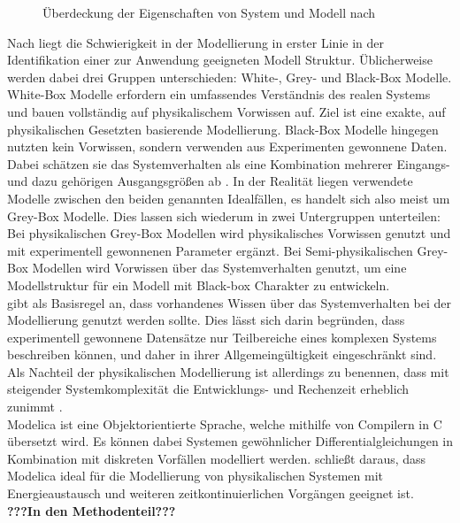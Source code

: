 \begin{figure}[h]
	\centering
		
		\caption{Überdeckung der Eigenschaften von System und Modell nach \citet{tabeling_softwaresysteme_2006}}
\label{fig:Modell-System}	
\end{figure}

Nach \citet{sjöberg_nonlinear_1995} liegt die Schwierigkeit in der Modellierung in erster Linie in der Identifikation einer zur Anwendung geeigneten Modell Struktur. Üblicherweise werden dabei drei Gruppen unterschieden: White-, Grey- und Black-Box Modelle. White-Box Modelle erfordern ein umfassendes Verständnis des realen Systems und bauen vollständig auf physikalischem Vorwissen auf. Ziel ist eine exakte, auf physikalischen Gesetzten basierende Modellierung. Black-Box Modelle hingegen nutzten kein Vorwissen, sondern verwenden aus Experimenten gewonnene Daten. Dabei schätzen sie das Systemverhalten als eine Kombination mehrerer Eingangs- und dazu gehörigen Ausgangsgrößen ab \citep[S.~3]{hauth_grey-box_2008}. In der Realität liegen verwendete Modelle zwischen den beiden genannten Idealfällen, es handelt sich also meist um Grey-Box Modelle. Dies lassen sich wiederum in zwei Untergruppen unterteilen: Bei physikalischen Grey-Box Modellen wird physikalisches Vorwissen genutzt und mit experimentell gewonnenen Parameter ergänzt. Bei Semi-physikalischen Grey-Box Modellen wird Vorwissen über das Systemverhalten genutzt, um eine Modellstruktur für ein Modell mit Black-box Charakter zu entwickeln.\\
\citet{sjöberg_nonlinear_1995} gibt als Basisregel an, dass vorhandenes Wissen über das Systemverhalten bei der Modellierung genutzt werden sollte. Dies lässt sich darin begründen, dass experimentell gewonnene Datensätze nur Teilbereiche eines komplexen Systems beschreiben können, und daher in ihrer Allgemeingültigkeit eingeschränkt sind. Als Nachteil der physikalischen Modellierung ist allerdings zu benennen, dass mit steigender Systemkomplexität die Entwicklungs- und Rechenzeit erheblich zunimmt \citep[S.~4]{hauth_grey-box_2008}.\\
 
Modelica ist eine Objektorientierte Sprache, welche mithilfe von Compilern in C übersetzt wird. Es können dabei 
Systemen gewöhnlicher Differentialgleichungen in Kombination  mit diskreten Vorfällen modelliert werden. \citet{schamai_modelica_2009} schließt daraus, dass Modelica ideal für die Modellierung von physikalischen Systemen mit Energieaustausch und weiteren zeitkontinuierlichen Vorgängen geeignet ist.
\\ \textbf{???In den Methodenteil???}\\


